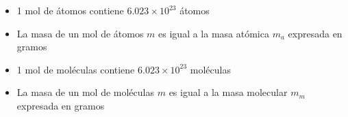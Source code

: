 \begin{warncard}[adjusted title={Implicaciones de la masa molar}]
    \begin{itemize}
        \item 1 mol de átomos contiene $6.023 \times 10^{23}$ átomos
        \item La masa de un mol de átomos $m$ es igual a la masa atómica $m_a$ expresada en gramos
        \item 1 mol de moléculas contiene $6.023 \times 10^{23}$ moléculas
        \item La masa de un mol de moléculas $m$ es igual a la masa molecular $m_m$ expresada en gramos
    \end{itemize}
\end{warncard}